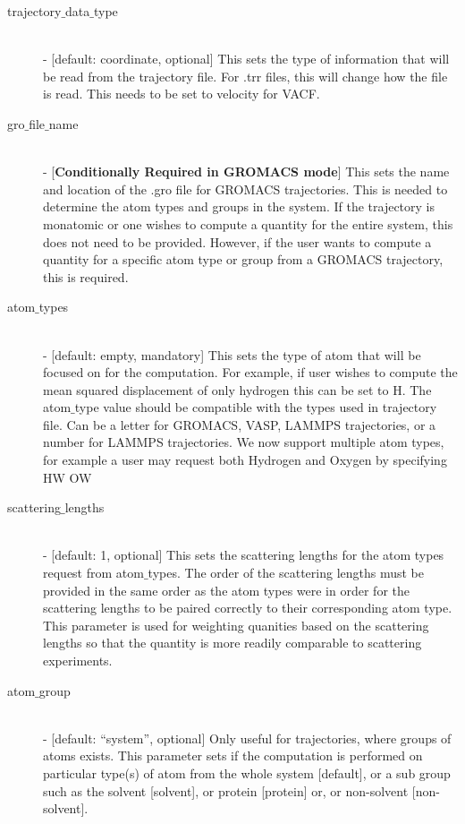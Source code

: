 \documentclass{article}
\begin{document}
\begin{description}
	\item[trajectory$\_$data$\_$type] \hfill \\
	- [default: coordinate, optional] This sets the type of information that will be read from the trajectory file.  For .trr files, this will change how the file is read.  This needs to be set to velocity for VACF.  
	
	\item[gro$\_$file$\_$name] \hfill \\
	- [\textbf{Conditionally Required in GROMACS mode}] This sets the name and location of the .gro file for GROMACS trajectories.  This is needed to determine the atom types and groups in the system.  If the trajectory is monatomic or one wishes to compute a quantity for the entire system, this does not need to be provided.  However, if the user wants to compute a quantity for a specific atom type or group from a GROMACS trajectory, this is required.
	
	\item[atom$\_$types] \hfill \\
	- [default: empty, mandatory]  This sets the type of atom that will be focused on for the computation.  For example, if user wishes to compute the mean squared displacement of only hydrogen this can be set to H.   The atom$\_$type value should be compatible with the types used in trajectory file. Can be a letter for GROMACS,  VASP,  LAMMPS trajectories, or a number for LAMMPS trajectories.  We now support multiple atom types, for example a user may request both Hydrogen and Oxygen by specifying HW OW
	
	\item[scattering$\_$lengths] \hfill \\
	- [default: 1, optional] This sets the scattering lengths for the atom types request from atom$\_$types.  The order of the scattering lengths must be provided in the same order as the atom types were in order for the scattering lengths to be paired correctly to their corresponding atom type.  This parameter is used for weighting quanities based on the scattering lengths so that the quantity is more readily comparable to scattering experiments.
	
	\item[atom$\_$group] \hfill \\
	- [default: ``system'', optional]  Only useful for trajectories, where groups of atoms exists.  This parameter sets if the computation is performed on particular type(s) of atom from the whole system [default], or a sub group such as the solvent [solvent], or protein [protein] or, or non-solvent [non-solvent].
	

\end{description}
\end{document}
